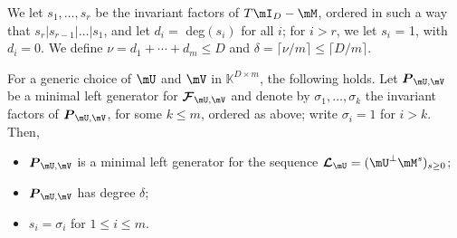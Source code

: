 \documentclass[12pt]{article}
\newcommand{\mat}[1]{\bm{\MakeUppercase{#1}}} %
\newcommand{\seq}{\mat{\mathcal{F}}} %
\newcommand{\seqL}{\mat{\mathcal{L}}} %
\newcommand{\todo}[1]{\textcolor{red}{{\bf todo:} #1}}
\def\K{\mathbb{K}}
\def\K {\ensuremath{\mathbb{K}}}
\begin{document}
We let $s_1, \dots, s_r$ be the invariant factors of $T\mI_D
- \mM$, ordered in such a way that $s_r | s_{r-1}| \dots | s_1$, and
let $d_i = $ deg$(s_i)$ for all $i$; for $i > r$, we let $s_i$ = 1,
with $d_i = 0$.  We define $\nu = d_1 + \cdots + d_m \le D$ and
$\delta = \lceil \nu / m \rceil \le \lceil D / m \rceil$.



\begin{theorem}
  \label{randXY}
  For a generic choice of $\mU$ and $\mV$ in $\K^{D \times m}$, the
  following holds.  Let $\mat{P}_{\mU,\mV}$ be a minimal left
  generator for $\seq_{\mU,\mV}$ and denote by $\sigma_1, \dots,
  \sigma_k$ the invariant factors of $\mat{P}_{\mU,\mV}$, for some $k
  \le m$, ordered as above; write $\sigma_i=1$ for $i > k$. Then,
  \begin{itemize}
  \item $\mat{P}_{\mU,\mV}$ is a minimal left generator for the
    sequence $\seqL_{\mU} = (\mU^\perp \mM^s)_{s \ge 0}$;
  \item $\mat{P}_{\mU,\mV}$ has degree $\delta$;
  \item $s_i = \sigma_i$ for $1 \le i \le m$.
  \end{itemize}
\end{theorem}
\end{document}
